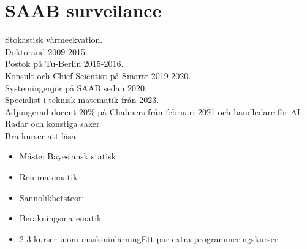 \chapter{SAAB surveilance}
Stokastisk värmeekvation.\\
Doktorand 2009-2015.\\
Postok på Tu-Berlin 2015-2016.\\
Konsult och Chief Scientist på Smartr 2019-2020.\\
Systemingenjör på SAAB sedan 2020.\\
Specialist i teknisk matematik från 2023. \\
Adjungerad docent 20\% på Chalmers från februari 2021 och handledare för AI.\\
Radar och konstiga saker
\\
Bra kurser att läsa
\begin{itemize}
	\item Måste: Bayesiansk statisk
	\item Ren matematik
	\item Sannolikhetsteori
	\item Beräkningsmatematik
	\item 2-3 kurser inom maskininlärningEtt par extra programmeringskurser
\end{itemize}